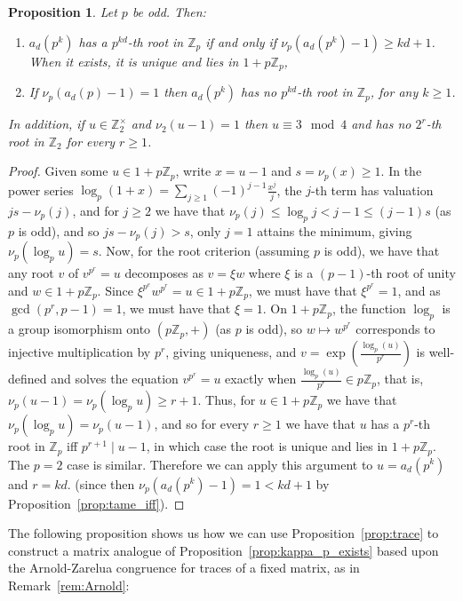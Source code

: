 \documentclass{article}
\theoremstyle{plain}
\newtheorem{proposition}[theorem]{Proposition}
\theoremstyle{definition}
\theoremstyle{remark}
\newcommand{\Z}{\mathbb{Z}}
\newcommand{\Zp}{\mathbb{Z}_p}
\begin{document}
\begin{proposition}\label{prop:rootexist}
Let $p$ be odd. Then:
\begin{enumerate}
    \item $a_d(p^k)$ has a $p^{kd}$-th root in $\Zp$ if and only if $\nu_p(a_d(p^k)-1) \geq kd+1$. When it exists, it is unique and lies in $1+p\Zp$,
    \item If $\nu_p(a_d(p)-1)=1$ then $a_d(p^k)$ has no $p^{kd}$-th root in $\Zp$, for any $k\ge1$.
\end{enumerate}
In addition, if $u \in \Z_2^\times$ and $\nu_2(u-1)=1$ then $u \equiv 3 \mod 4$ and has no $2^r$-th root in $\Z_2$ for every $r \geq 1$. 
\end{proposition}
\begin{proof}
Given some $u \in 1+p\Zp$, write $x=u-1$ and $s=\nu_p(x)\ge1$. In the power series $\log_p(1+x)=\sum_{j\ge1}(-1)^{j-1}\frac{x^j}{j}$, the $j$-th term has valuation $js-\nu_p(j)$, and for $j\ge2$ we have that $\nu_p(j)\le\log_pj<j-1\le(j-1)s$ (as $p$ is odd), and so $js-\nu_p(j)>s$, only $j=1$ attains the minimum, giving $\nu_p(\log_p u)=s$. Now, for the root criterion (assuming $p$ is odd), we have that any root $v$ of $v^{p^r}=u$ decomposes as $v=\xi w$ where  $\xi$ is a $(p-1)$-th root of unity and $w\in1+p\Zp$. Since $\xi^{p^e}w^{p^r}=u\in1+p\Zp$, we must have that $\xi^{p^r}=1$, and as $\gcd(p^r,p-1)=1$, we must have that $\xi=1$. On $1+p\Zp$, the function $\log_p$ is a group isomorphism onto $(p\Zp,+)$ (as $p$ is odd), so $w\mapsto w^{p^r}$ corresponds to injective multiplication by $p^r$, giving uniqueness, and $v=\exp\left(\frac{\log_p(u)}{p^r}\right)$ is well-defined and solves the equation $v^{p^r}=u$ exactly when $\frac{\log_p(u)}{p^r}\in p\Zp$, that is,  $\nu_p(u-1)=\nu_p(\log_p u)\ge r+1$. Thus, for $u\in1+p\Zp$ we have that $\nu_p(\log_p u)=\nu_p(u-1)$, and so for every $r\ge1$ we have that $u$ has a $p^r$-th root in $\Zp$ iff $p^{r+1}\mid u-1$, in which case the root is unique and lies in $1+p\Zp$. The $p=2$ case is similar. Therefore we can apply this argument to  $u=a_d(p^k)$ and $r=kd$. (since then $\nu_p(a_d(p^k)-1)=1<kd+1$ by Proposition~\ref{prop:tame_iff}). 
\end{proof}

The following proposition shows us how we can use Proposition~\ref{prop:trace} to construct a matrix analogue of Proposition~\ref{prop:kappa_p_exists} based upon the Arnold-Zarelua congruence for traces of a fixed matrix, as in Remark~\ref{rem:Arnold}:
\end{document}
